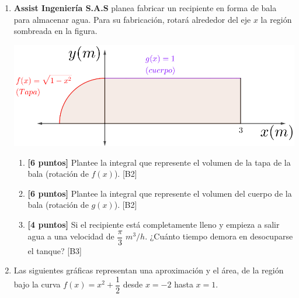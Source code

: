 \documentclass[10pt]{exam}
\begin{document}
\begin{enumerate}
\begin{enumerate}
\end{enumerate}

  
\item \textbf{Assist Ingeniería S.A.S} planea fabricar un recipiente en forma de bala para almacenar agua. Para su fabricación, rotará alrededor del eje $x$ la región sombreada en la figura.

\begin{center}
    \includegraphics[scale=1.5]{Depositobala2.png}
\end{center}

\begin{enumerate}
   \item \textbf{[6 puntos]} Plantee la integral que represente el volumen de la tapa de la bala (rotación de $f(x)$). \hfill{[B2]}

   \item \textbf{[6 puntos]} Plantee la integral que represente el volumen del cuerpo de la bala (rotación de $g(x)$). \hfill{[B2]}
    
   \item \textbf{[4 puntos]} Si el recipiente está completamente lleno y empieza a salir agua a una velocidad de $\dfrac{\pi}{3}$ $m^3/h$.  ¿Cuánto tiempo demora en desocuparse el tanque?  \hfill{[B3]}
    
    
\end{enumerate}

\item Las siguientes gráficas representan una aproximación y el área, de la región bajo la curva $f(x)=x^2+\dfrac{1}{2}$ desde $x=-2$ hasta $x=1$.


\end{enumerate}
\end{document}
